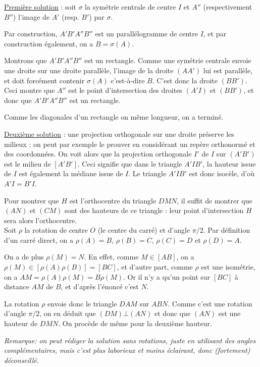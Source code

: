 \begin{Soln}{22}
\underline{Première solution} : soit $\sigma$ la symétrie centrale de centre $I$ et  $A''$ (respectivement $B''$) l'image de $A'$ (resp. $B'$) par $\sigma$.

Par construction, $A'B'A''B''$ est un parallélogramme de centre $I$, et par construction également, on a $B=\sigma(A)$.

Montrons que $A'B'A''B''$ est un rectangle. Comme une symétrie centrale envoie une droite sur une droite parallèle, l'image de la droite $(AA')$ lui est parallèle, et doit forcément contenir $\sigma(A)$ c'est-à-dire $B$. C'est donc la droite $(BB')$. Ceci montre que $A''$ est le point d'intersection des droites $(A'I)$ et $(BB')$, et donc que $A'B'A''B''$ est un rectangle.

Comme les diagonales d'un rectangle on même longueur, on a terminé.

\underline{Deuxième solution} : une projection orthogonale sur une droite préserve les milieux : on peut par exemple le prouver en considérant un repère orthonormé et des coordonnées. On voit alors que la  projection orthogonale $I'$ de $I$ sur $(A'B')$ est le milieu de $[A'B']$. Ceci signifie que dans le triangle $A'IB'$, la hauteur issue de $I$ est également la médiane issue de $I$. Le triangle $A'IB'$ est donc isocèle, d'où $A'I = B'I$.
\end{Soln}
\begin{Soln}{23}
Pour montrer que $H$ est l'orthocentre du triangle $DMN$, il suffit de montrer que  $(AN)$ et $(CM)$ sont des hauteurs de ce triangle : leur point d'intersection $H$ sera alors l'orthocentre.\\

Soit $\rho$ la rotation de centre $O$ (le centre du carré) et d'angle $\pi/2$. Par définition d'un carré direct, on a $\rho(A)=B$, $\rho(B)=C$, $\rho(C)=D$ et $\rho(D)=A$.

On a de plus \underline{$\rho(M)=N$}. En effet, comme $M \in [AB]$, on a $\rho(M) \in [\rho(A)\rho(B)] = [BC]$, et d'autre part, comme $\rho$ est une isométrie, on a $AM = \rho(A)\rho(M) =  B\rho(M)$. Or il n'y a qu'un point sur $[BC]$ à distance $AM$ de $B$, et d'après l'énoncé c'est $N$.

La rotation $\rho$ envoie donc le triangle $DAM$ sur $ABN$. Comme c'est une rotation d'angle $\pi/2$, on en déduit que $(DM)\bot (AN)$ et donc que $(AN)$ est une hauteur de $DMN$. On procède de même pour la deuxième hauteur.

\emph{Remarque: on peut rédiger la solution sans rotations, juste en utilisant des angles complémentaires, mais c'est plus laborieux et moins éclairant, donc (fortement) déconseillé.}
\end{Soln}
